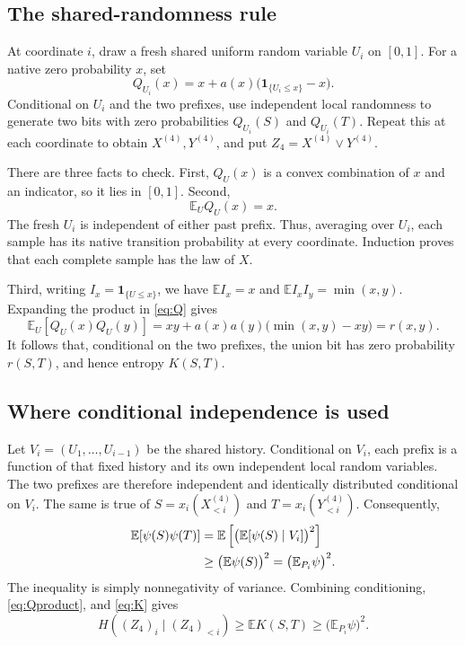 \documentclass[11pt]{article}
\theoremstyle{remark}
\newcommand{\E}{\mathbb E}
\newcommand{\ind}{\mathbf 1}
\begin{document}
\subsection{The shared-randomness rule}
At coordinate \(i\), draw a fresh shared uniform random variable
\(U_i\) on \([0,1]\). For a native zero probability \(x\), set
\begin{equation}\label{eq:Q}
Q_{U_i}(x)=x+a(x)\bigl(\ind_{\{U_i\le x\}}-x\bigr).
\end{equation}
Conditional on \(U_i\) and the two prefixes, use independent local
randomness to generate two bits with zero probabilities \(Q_{U_i}(S)\)
and \(Q_{U_i}(T)\). Repeat this at each coordinate to obtain
\(X^{(4)},Y^{(4)}\), and put \(Z_4=X^{(4)}\lor Y^{(4)}\).

There are three facts to check.
First, \(Q_U(x)\) is a convex combination of \(x\) and an indicator,
so it lies in \([0,1]\). Second,
\[
\E_UQ_U(x)=x.
\]
The fresh \(U_i\) is independent of either past prefix. Thus,
averaging over \(U_i\), each sample has its native transition
probability at every coordinate. Induction proves that each
complete sample has the law of \(X\).

Third, writing \(I_x=\ind_{\{U\le x\}}\), we have
\(\E I_x=x\) and \(\E I_xI_y=\min(x,y)\). Expanding the product in
\eqref{eq:Q} gives
\begin{equation}\label{eq:Qproduct}
\E_U[Q_U(x)Q_U(y)]
=xy+a(x)a(y)\bigl(\min(x,y)-xy\bigr)=r(x,y).
\end{equation}
It follows that, conditional on the two prefixes, the union bit
has zero probability \(r(S,T)\), and hence entropy \(K(S,T)\).

\subsection{Where conditional independence is used}
Let \(V_i=(U_1,\ldots,U_{i-1})\) be the shared history.
Conditional on \(V_i\), each prefix is a function of that fixed
history and its own independent local random variables. The two
prefixes are therefore independent and identically distributed
conditional on \(V_i\). The same is true of
\(S=x_i(X^{(4)}_{<i})\) and \(T=x_i(Y^{(4)}_{<i})\).
Consequently,
\begin{align}
\E[\psi(S)\psi(T)]
&=\E\left[\bigl(\E[\psi(S)\mid V_i]\bigr)^2\right]\notag\\
&\ge\bigl(\E\psi(S)\bigr)^2
=\bigl(\E_{P_i}\psi\bigr)^2. \label{eq:conditional-jensen}
\end{align}
The inequality is simply nonnegativity of variance.
Combining conditioning, \eqref{eq:Qproduct}, and \eqref{eq:K} gives
\begin{equation}\label{eq:rule4-lower}
H((Z_4)_i\mid (Z_4)_{<i})
\ge \E K(S,T)\ge\bigl(\E_{P_i}\psi\bigr)^2.
\end{equation}
\end{document}
